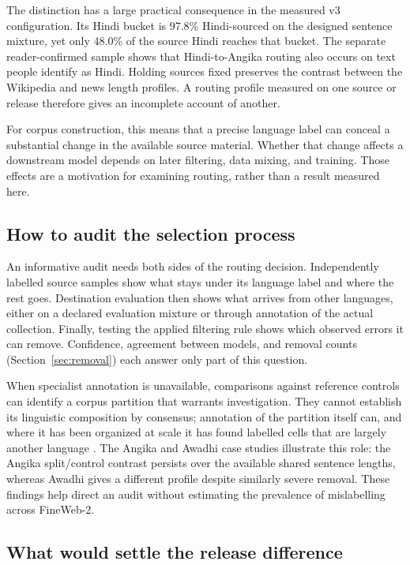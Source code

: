 \documentclass[final]{clv2025}
\begin{document}
The distinction has a large practical consequence in the measured v3 configuration. Its Hindi bucket is 97.8\% Hindi-sourced on the designed sentence mixture, yet only 48.0\% of the source Hindi reaches that bucket. The separate reader-confirmed sample shows that Hindi-to-Angika routing also occurs on text people identify as Hindi. Holding sources fixed preserves the contrast between the Wikipedia and news length profiles. A routing profile measured on one source or release therefore gives an incomplete account of another.

For corpus construction, this means that a precise language label can conceal a substantial change in the available source material. Whether that change affects a downstream model depends on later filtering, data mixing, and training. Those effects are a motivation for examining routing, rather than a result measured here.

\subsection{How to audit the selection process}

An informative audit needs both sides of the routing decision. Independently labelled source samples show what stays under its language label and where the rest goes. Destination evaluation then shows what arrives from other languages, either on a declared evaluation mixture or through annotation of the actual collection. Finally, testing the applied filtering rule shows which observed errors it can remove. Confidence, agreement between models, and removal counts (Section~\ref{sec:removal}) each answer only part of this question.

When specialist annotation is unavailable, comparisons against reference controls can identify a corpus partition that warrants investigation. They cannot establish its linguistic composition by consensus; annotation of the partition itself can, and where it has been organized at scale it has found labelled cells that are largely another language \citep{vanstrien2025fineweb}. The Angika and Awadhi case studies illustrate this role: the Angika split/control contrast persists over the available shared sentence lengths, whereas Awadhi gives a different profile despite similarly severe removal. These findings help direct an audit without estimating the prevalence of mislabelling across FineWeb-2.

\subsection{What would settle the release difference}\label{sec:release}
\end{document}
